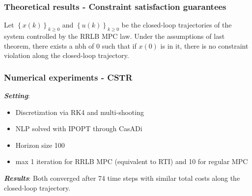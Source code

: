 \documentclass[10pt]{beamer}
\begin{document}
\begin{frame}
    \frametitle{Theoretical results - Constraint satisfaction guarantees}
    \begin{theorem}
        Let $\left\{ x(k) \right\}_{k\geq 0}$ and $\left\{ u(k) \right\}_{k\geq 0}$ be the closed-loop trajectories of the system controlled by the RRLB MPC law.
        Under the assumptions of last theorem, there exists a nbh of 0 such that if $x(0)$ is in it, there is no constraint violation along the closed-loop trajectory.
    \end{theorem}
\end{frame}

\begin{frame}
    \frametitle{Numerical experiments - CSTR}
    \textit{\textbf{Setting}}:
    \begin{itemize}[label=\textbullet]
        \item Discretization via RK4 and multi-shooting
        \item NLP solved with IPOPT through CasADi
        \item Horizon size 100
        \item max 1 iteration for RRLB MPC (equivalent to RTI) and 10 for regular MPC
    \end{itemize}

    \textbf{\textit{Results}}:
    Both converged after 74 time steps with similar total costs along the closed-loop trajectory.

    
    

\end{frame}
\end{document}
